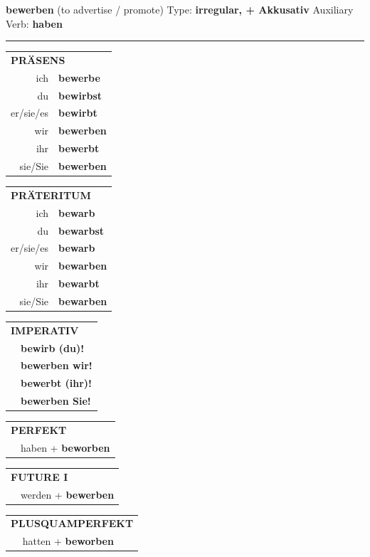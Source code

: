 \documentclass[10pt,a4paper]{revtex4-2}
\begin{document}
\begin{verbbox-acc}
{\Large \bf bewerben} (to advertise / promote) \hfill Type: \textbf{irregular, + Akkusativ} \hfill Auxiliary Verb: \textbf{haben}

\vspace{5pt}
\hrule
\vspace{5pt}

\begin{tabular}{rl}
\multicolumn{2}{l}{\textbf{PRÄSENS}}\\
ich & \textbf{bewerbe}\\
du & \textbf{bewirbst}\\
er/sie/es & \textbf{bewirbt}\\
wir & \textbf{bewerben}\\
ihr & \textbf{bewerbt}\\
sie/Sie & \textbf{bewerben}\\
\end{tabular}
\hfill
\begin{tabular}{rl}
\multicolumn{2}{l}{\textbf{PRÄTERITUM}}\\
ich & \textbf{bewarb}\\
du & \textbf{bewarbst}\\
er/sie/es & \textbf{bewarb}\\
wir & \textbf{bewarben}\\
ihr & \textbf{bewarbt}\\
sie/Sie & \textbf{bewarben}\\
\end{tabular}
\hfill
\begin{tabular}{rl}
\multicolumn{2}{l}{\textbf{IMPERATIV}}\\
& \textbf{bewirb (du)!}\\
& \textbf{bewerben wir!}\\
& \textbf{bewerbt (ihr)!}\\
& \textbf{bewerben Sie!}\\
\end{tabular}

\vspace{10pt}

\begin{tabular}{rl}
\multicolumn{2}{l}{\textbf{PERFEKT}}\\
& haben + \textbf{beworben}\\
\end{tabular}
\hfill
\begin{tabular}{rl}
\multicolumn{2}{l}{\textbf{FUTURE I}}\\
& werden + \textbf{bewerben}\\
\end{tabular}
\hfill
\begin{tabular}{rl}
\multicolumn{2}{l}{\textbf{PLUSQUAMPERFEKT}}\\
& hatten + \textbf{beworben}\\
\end{tabular}


\end{verbbox-acc}
\end{document}
